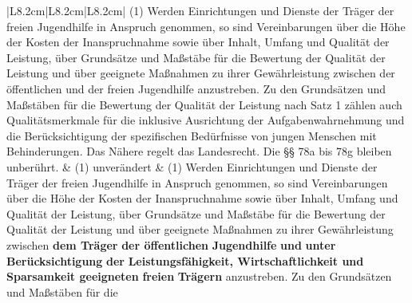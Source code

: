 \documentclass[10pt,a4paper,landscape]{article}
\begin{document}
\begin{longtable}{|L{8.2cm}|L{8.2cm}|L{8.2cm}|}
(1) Werden Einrichtungen und Dienste der  \newline Träger der freien Jugendhilfe in Anspruch  \newline genommen, so sind Vereinbarungen über  \newline die Höhe der Kosten der Inanspruchnahme  \newline sowie über Inhalt, Umfang und Qualität der  \newline Leistung, über Grundsätze und Maßstäbe  \newline für die Bewertung der Qualität der Leistung  \newline und über geeignete Maßnahmen zu ihrer  \newline Gewährleistung zwischen der öffentlichen  \newline und der freien \textcolor{diffred}{Jugendhilfe} anzustreben. Zu  \newline den Grundsätzen und Maßstäben für die  \newline Bewertung der Qualität der Leistung nach  \newline Satz 1 zählen auch Qualitätsmerkmale für  \newline die inklusive Ausrichtung der  \newline Aufgabenwahrnehmung und die  \newline Berücksichtigung der spezifischen  \newline Bedürfnisse von jungen Menschen mit  \newline Behinderungen. Das Nähere regelt das  \newline Landesrecht. Die \S{}\S{} 78a bis 78g bleiben  \newline unberührt. & (1) unverändert & (1) Werden Einrichtungen und Dienste der  \newline Träger der freien Jugendhilfe in Anspruch  \newline genommen, so sind Vereinbarungen über  \newline die Höhe der Kosten der Inanspruchnahme  \newline sowie über Inhalt, Umfang und Qualität der  \newline Leistung, über Grundsätze und Maßstäbe  \newline für die Bewertung der Qualität der Leistung  \newline und über geeignete Maßnahmen zu ihrer  \newline Gewährleistung zwischen \textbf{\textcolor{diffgreen}{dem Träger}}\textbf{ der  \newline öffentlichen }\textbf{\textcolor{diffgreen}{Jugendhilfe}}\textbf{ und }\textbf{\textcolor{diffgreen}{unter  \newline Berücksichtigung}}\textbf{ der} \newline \textbf{\textcolor{diffgreen}{Leistungsfähigkeit, Wirtschaftlichkeit  \newline und Sparsamkeit geeigneten}}\textbf{ freien} \newline \textbf{\textcolor{diffgreen}{Trägern}} anzustreben. Zu den Grundsätzen  \newline und Maßstäben für die 
\end{longtable}
\end{document}
